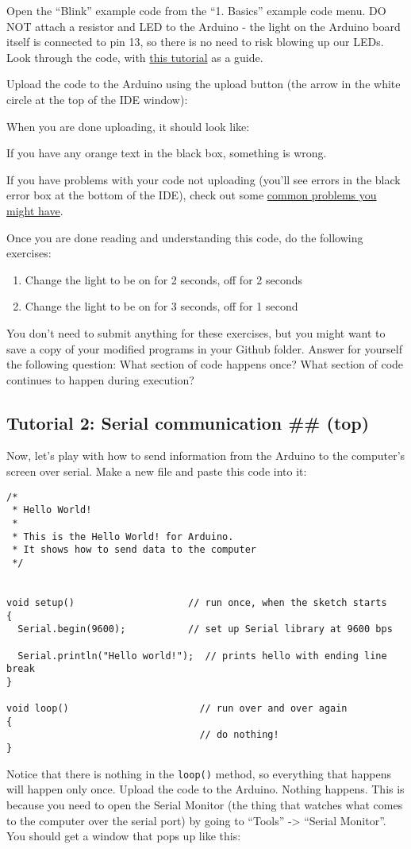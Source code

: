 \documentclass[letterpaper,10pt,english]{/usr/local/lib/python2.7/dist-packages/sphinx/texinputs/sphinxhowto}
\begin{document}
Open the ``Blink'' example code from the ``1. Basics'' example code
menu. DO NOT attach a resistor and LED to the Arduino - the light on the
Arduino board itself is connected to pin 13, so there is no need to risk
blowing up our LEDs. Look through the code, with
\href{http://arduino.cc/en/Tutorial/Blink}{this tutorial} as a guide.

Upload the code to the Arduino using the upload button (the arrow in the
white circle at the top of the IDE window):

When you are done uploading, it should look like:

If you have any orange text in the black box, something is wrong.

If you have problems with your code not uploading (you'll see errors in
the black error box at the bottom of the IDE), check out some
\href{CommonArduinoProblems.ipynb}{common problems you might have}.

Once you are done reading and understanding this code, do the following
exercises:

\begin{enumerate}[1.]
\item
  Change the light to be on for 2 seconds, off for 2 seconds
\item
  Change the light to be on for 3 seconds, off for 1 second
\end{enumerate}
You don't need to submit anything for these exercises, but you might
want to save a copy of your modified programs in your Github folder.
Answer for yourself the following question: What section of code happens
once? What section of code continues to happen during execution?\subsection{Tutorial 2: Serial communication \#\# (top)}Now, let's play with how to send information from the Arduino to the
computer's screen over serial. Make a new file and paste this code into
it:\begin{verbatim}
/*
 * Hello World!
 *
 * This is the Hello World! for Arduino. 
 * It shows how to send data to the computer
 */


void setup()                    // run once, when the sketch starts
{
  Serial.begin(9600);           // set up Serial library at 9600 bps

  Serial.println("Hello world!");  // prints hello with ending line break 
}

void loop()                       // run over and over again
{
                                  // do nothing!
}
\end{verbatim}Notice that there is nothing in the \texttt{loop()} method, so
everything that happens will happen only once. Upload the code to the
Arduino. Nothing happens. This is because you need to open the Serial
Monitor (the thing that watches what comes to the computer over the
serial port) by going to ``Tools'' -\textgreater{} ``Serial Monitor''.
You should get a window that pops up like this:
\end{document}
